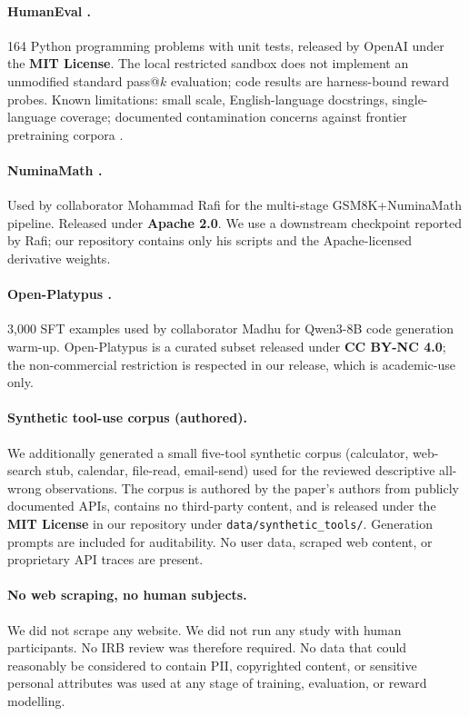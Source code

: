 \paragraph{HumanEval \cite{chen2021codex}.}
164 Python programming problems with unit tests, released by OpenAI under
the \textbf{MIT License}. The local restricted sandbox does not implement an unmodified standard
pass@$k$ evaluation; code results are harness-bound reward probes. Known
limitations: small scale, English-language docstrings, single-language
coverage; documented contamination concerns against frontier pretraining
corpora \cite{riddell2024contamination}.

\paragraph{NuminaMath \cite{li2024numinamath}.}
Used by collaborator Mohammad Rafi for the multi-stage
GSM8K+NuminaMath pipeline. Released under \textbf{Apache 2.0}. We use a
downstream checkpoint reported by Rafi; our repository contains only his
scripts and the Apache-licensed derivative weights.

\paragraph{Open-Platypus \cite{lee2023platypus}.}
3{,}000 SFT examples used by collaborator Madhu for Qwen3-8B code
generation warm-up. Open-Platypus is a curated subset released under
\textbf{CC BY-NC 4.0}; the non-commercial restriction is respected in our
release, which is academic-use only.

\paragraph{Synthetic tool-use corpus (authored).}
We additionally generated a small five-tool synthetic corpus (calculator,
web-search stub, calendar, file-read, email-send) used for the reviewed descriptive
all-wrong observations. The corpus is authored by the paper's authors from
publicly documented APIs, contains no third-party content, and is
released under the \textbf{MIT License} in our repository under
\texttt{data/synthetic\_tools/}. Generation prompts are included for
auditability. No user data, scraped web content, or proprietary API
traces are present.

\paragraph{No web scraping, no human subjects.}
We did not scrape any website. We did not run any study with human
participants. No IRB review was therefore required. No data that could
reasonably be considered to contain PII, copyrighted content, or sensitive
personal attributes was used at any stage of training, evaluation, or
reward modelling.

